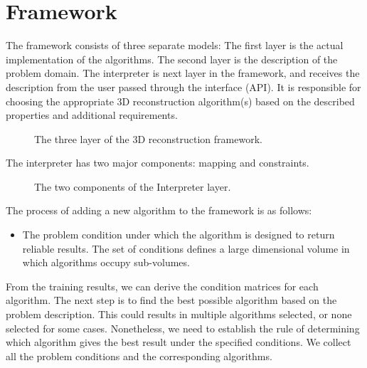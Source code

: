 \section{Framework}
The framework consists of three separate models: The first layer is the actual implementation of the algorithms. The second layer is the description of the problem domain. The interpreter is next layer in the framework, and receives the description from the user passed through the interface (\eg API). It is responsible for choosing the appropriate 3D reconstruction algorithm(s) based on the described properties and additional requirements.
\begin{figure}[!htbp]
\centering
{}
\caption{The three layer of the 3D reconstruction framework.}
\label{fig:framework_overview}
\end{figure}

The interpreter has two major components: mapping and constraints.
\begin{figure}[!htbp]
\centering
{}
\caption{The two components of the Interpreter layer.}
\label{fig:interpreter_layer}
\end{figure}

The process of adding a new algorithm to the framework is as follows:
\begin{itemize}
\item The problem condition under which the algorithm is designed to return reliable results. The set of conditions defines a large dimensional volume in which algorithms occupy sub-volumes.
\end{itemize}
From the training results, we can derive the condition matrices for each algorithm. The next step is to find the best possible algorithm based on the problem description. This could results in multiple algorithms selected, or none selected for some cases. Nonetheless, we need to establish the rule of determining which algorithm gives the best result under the specified conditions. We collect all the problem conditions and the corresponding algorithms.

